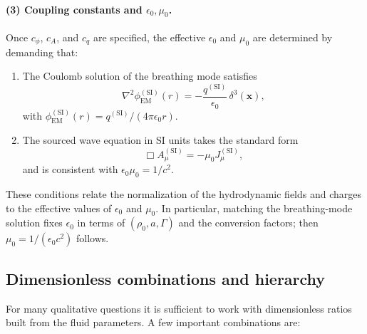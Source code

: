 \documentclass[11pt]{article}
\begin{document}
\paragraph{(3) Coupling constants and \texorpdfstring{$\epsilon_0,\mu_0$}{epsilon\_0,mu\_0}.}

Once $c_\phi$, $c_A$, and $c_q$ are specified, the effective $\epsilon_0$ and $\mu_0$ are determined by demanding that:

\begin{enumerate}
  \item The Coulomb solution of the breathing mode satisfies
    \begin{equation}
    \nabla^2 \phi_{\mathrm{EM}}^{\mathrm{(SI)}}(r)
    = -\frac{q^{\mathrm{(SI)}}}{\epsilon_0}\,\delta^3(\mathbf{x}),
    \end{equation}
    with $\phi_{\mathrm{EM}}^{\mathrm{(SI)}}(r) = q^{\mathrm{(SI)}}/(4\pi\epsilon_0 r)$.

  \item The sourced wave equation in SI units takes the standard form
    \begin{equation}
    \Box A_\mu^{\mathrm{(SI)}}
    = -\mu_0 J_\mu^{\mathrm{(SI)}},
    \end{equation}
    and is consistent with $\epsilon_0 \mu_0 = 1/c^2$.
\end{enumerate}

These conditions relate the normalization of the hydrodynamic fields and charges to the effective values of $\epsilon_0$ and $\mu_0$.  In particular, matching the breathing-mode solution fixes $\epsilon_0$ in terms of $(\rho_0,a,\Gamma)$ and the conversion factors; then $\mu_0 = 1/(\epsilon_0 c^2)$ follows.

\subsection{Dimensionless combinations and hierarchy}

For many qualitative questions it is sufficient to work with dimensionless ratios built from the fluid parameters.  A few important combinations are:
\end{document}
